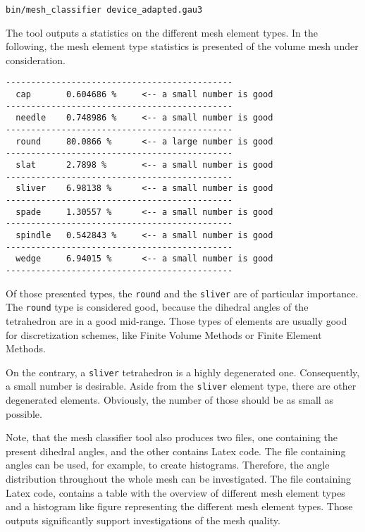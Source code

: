 \begin{exaipd}
\begin{Verbatim}
bin/mesh_classifier device_adapted.gau3
\end{Verbatim}
\end{exaipd}

The tool outputs a statistics on the different mesh element types. 
In the following, the mesh element type statistics is presented of 
the volume mesh under consideration.

\begin{exaipd}
\begin{Verbatim}
---------------------------------------------
  cap       0.604686 %     <-- a small number is good
---------------------------------------------
  needle    0.748986 %     <-- a small number is good
---------------------------------------------
  round     80.0866 %      <-- a large number is good
---------------------------------------------
  slat      2.7898 %       <-- a small number is good
---------------------------------------------
  sliver    6.98138 %      <-- a small number is good
---------------------------------------------
  spade     1.30557 %      <-- a small number is good
---------------------------------------------
  spindle   0.542843 %     <-- a small number is good
---------------------------------------------
  wedge     6.94015 %      <-- a small number is good
---------------------------------------------
\end{Verbatim}
\end{exaipd}

Of those presented types, the \texttt{round} and the \texttt{sliver} 
are of particular importance. The \texttt{round} type is considered good, 
because the dihedral angles of the tetrahedron are in a good mid-range. 
Those types of elements are usually good for discretization schemes, like 
Finite Volume Methods or Finite Element Methods. 

On the contrary, a \texttt{sliver} tetrahedron is a highly degenerated one. 
Consequently, a small number is desirable. Aside from the \texttt{sliver}
element type, there are other degenerated elements. Obviously, the number of 
those should be as small as possible. 

Note, that the mesh classifier tool also produces two files, one containing 
the present dihedral angles, and the other contains Latex code. 
The file containing angles can be used, for example, to create histograms.
Therefore, the angle distribution throughout the whole mesh can be investigated.
The file containing Latex code, contains a table with the overview of different 
mesh element types and a histogram like figure representing the different mesh 
element types. 
Those outputs significantly support investigations of the mesh quality.


